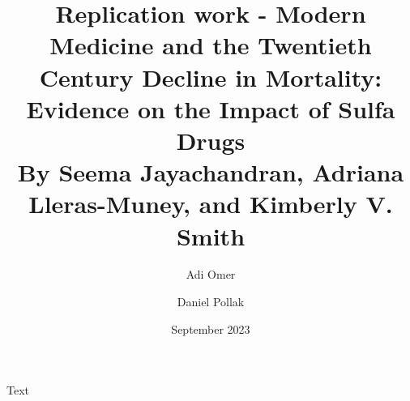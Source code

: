 \documentclass[12pt, letterpaper]{article}
\title{Replication work - Modern Medicine and the Twentieth Century Decline in
Mortality: Evidence on the Impact of Sulfa Drugs \\
\large By Seema Jayachandran, Adriana Lleras-Muney, and Kimberly V. Smith}
\author{
  Adi Omer
  \and
  Daniel Pollak
}
\date{September 2023}
\begin{document}
\maketitle
Text
\end{document}
